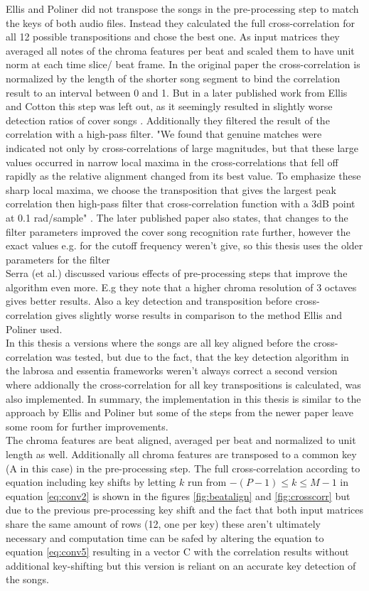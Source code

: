 Ellis and Poliner did not transpose the songs in the pre-processing step to match the keys of both audio files. Instead they calculated the full cross-correlation for all 12 possible transpositions and chose the best one. 
As input matrices they averaged all notes of the chroma features per beat and scaled them to have unit norm at each time slice/ beat frame.
In the original paper the cross-correlation is normalized by the length of the shorter song segment to bind the correlation result to an interval between 0 and 1. But in a later published work from Ellis and Cotton this step was left out, as it seemingly resulted in slightly worse detection ratios of cover songs \cite{cover802}. 
Additionally they filtered the result of the correlation with a high-pass filter. "We found that genuine matches were indicated not only by cross-correlations of large magnitudes, but that these large values occurred in narrow local maxima in the cross-correlations that fell off rapidly as the relative alignment changed from its best value. To emphasize these sharp local maxima, we choose the transposition that gives the largest peak correlation then high-pass filter that cross-correlation function with a 3dB point at 0.1 rad/sample" \cite[p. 1431]{chroma3}. The later published paper \cite{cover802} also states, that changes to the filter parameters improved the cover song recognition rate further, however the exact values e.g. for the cutoff frequency weren't give, so this thesis uses the older parameters for the filter\\
Serra (et al.) discussed various effects of pre-processing steps that improve the algorithm even more. E.g they note that a higher chroma resolution of 3 octaves gives better results. Also a key detection and transposition before cross-correlation gives slightly worse results in comparison to the method Ellis and Poliner used.\\ 
In this thesis a versions where the songs are all key aligned before the cross-correlation was tested, but due to the fact, that the key detection algorithm in the labrosa and essentia frameworks weren't always correct a second version where addionally the cross-correlation for all key transpositions is calculated, was also implemented. 
In summary, the implementation in this thesis is similar to the approach by Ellis and Poliner \cite{chroma3} but some of the steps from the newer paper \cite{cover802} leave some room for further improvements.\\ The chroma features are beat aligned, averaged per beat and normalized to unit length as well. Additionally all chroma features are transposed to a common key (A in this case) in the pre-processing step. The full cross-correlation according to equation including key shifts by letting $k$ run from $-(P - 1) \leq k \leq M - 1$ in equation \ref{eq:conv2} is shown in the figures \ref{fig:beatalign} and \ref{fig:crosscorr} but due to the previous pre-processing key shift and the fact that both input matrices share the same amount of rows (12, one per key) these aren't ultimately necessary and computation time can be safed by altering the equation to equation \ref{eq:conv5} resulting in a vector C with the correlation results without additional key-shifting but this version is reliant on an accurate key detection of the songs.
